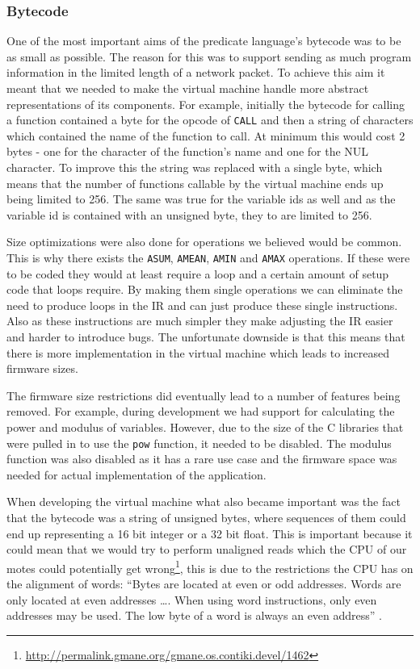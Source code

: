\subsubsection{Bytecode}

One of the most important aims of the predicate language's bytecode was to be as small as possible. The reason for this was to support sending as much program information in the limited length of a network packet. To achieve this aim it meant that we needed to make the virtual machine handle more abstract representations of its components. For example, initially the bytecode for calling a function contained a byte for the opcode of \verb|CALL| and then a string of characters which contained the name of the function to call. At minimum this would cost 2 bytes - one for the character of the function's name and one for the NUL character. To improve this the string was replaced with a single byte, which means that the number of functions callable by the virtual machine ends up being limited to 256. The same was true for the variable ids as well and as the variable id is contained with an unsigned byte, they to are limited to 256.

Size optimizations were also done for operations we believed would be common. This is why there exists the \verb|ASUM|, \verb|AMEAN|, \verb|AMIN| and \verb|AMAX| operations. If these were to be coded they would at least require a loop and a certain amount of setup code that loops require. By making them single operations we can eliminate the need to produce loops in the IR and can just produce these single instructions. Also as these instructions are much simpler they make adjusting the IR easier and harder to introduce bugs. The unfortunate downside is that this means that there is more implementation in the virtual machine which leads to increased firmware sizes.

The firmware size restrictions did eventually lead to a number of features being removed. For example, during development we had support for calculating the power and modulus of variables. However, due to the size of the C libraries that were pulled in to use the \verb|pow| function, it needed to be disabled. The modulus function was also disabled as it has a rare use case and the firmware space was needed for actual implementation of the application.


When developing the virtual machine what also became important was the fact that the bytecode was a string of unsigned bytes, where sequences of them could end up representing a 16 bit integer or a 32 bit float. This is important because it could mean that we would try to perform unaligned reads which the CPU of our motes could potentially get wrong\footnote{\url{http://permalink.gmane.org/gmane.os.contiki.devel/1462}}, this is due to the restrictions the CPU has on the alignment of words: ``Bytes are located at even or odd addresses. Words are only located at even addresses \ldots. When using word instructions, only even addresses may be used. The low byte of a word is always an even address'' \cite[Section~1.4.5 (p.~28)]{msp430usersguide}.


